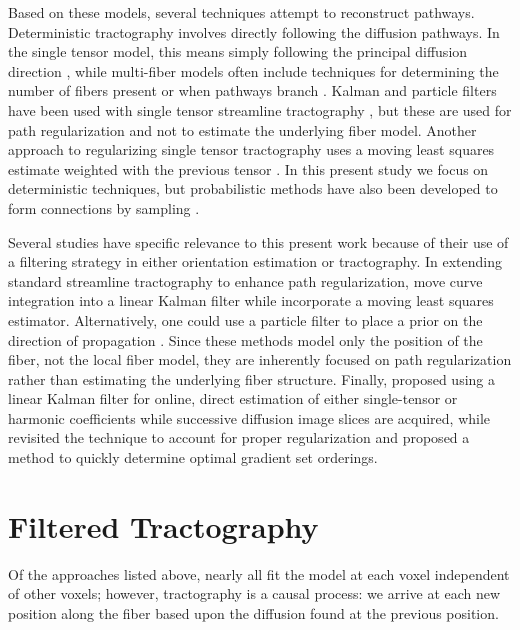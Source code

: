 \documentclass[letterpaper,hyperref,12pt]{gatech-thesis}
\begin{document}
Based on these models, several techniques attempt to reconstruct pathways.
%
Deterministic tractography involves directly following the diffusion pathways.
In the single tensor model, this means simply following the principal
diffusion direction \cite{Basser2000}, while multi-fiber models often include
techniques for determining the number of fibers present or when pathways
branch \cite{Hagmann2004,Kreher2005,Guo2006}.  Kalman and particle filters
have been used with single tensor streamline tractography
\cite{Gossl2002,Bjornemo2002,Zhang2009}, but these are used for path
regularization and not to estimate the underlying fiber model.  Another
approach to regularizing single tensor tractography uses a moving least
squares estimate weighted with the previous tensor \cite{Zhukov2002}.
%
In this present study we focus on deterministic techniques, but probabilistic
methods have also been developed to form connections by sampling
\cite{Parker2003,Hosey2005,Behrens2007}.

Several studies have specific relevance to this present work because of their
use of a filtering strategy in either orientation estimation or tractography.
%
In extending standard streamline tractography to enhance path regularization,
\cite{Gossl2002} move curve integration into a linear Kalman filter while
\cite{Zhukov2002} incorporate a moving least squares estimator.
%
Alternatively, one could use a particle filter to place a prior on the
direction of propagation \cite{Zhang2009}.
%
Since these methods model only the position of the fiber, not the local fiber
model, they are inherently focused on path regularization rather than
estimating the underlying fiber structure.
%
Finally, \cite{Poupon2008} proposed using a linear Kalman filter for online,
direct estimation of either single-tensor or harmonic coefficients while
successive diffusion image slices are acquired, while \cite{Deriche2009}
revisited the technique to account for proper regularization and proposed a
method to quickly determine optimal gradient set orderings.



\section{Filtered Tractography}

Of the approaches listed above, nearly all fit the model at each voxel
independent of other voxels; however, tractography is a causal process: we
arrive at each new position along the fiber based upon the diffusion found at
the previous position.
\end{document}

